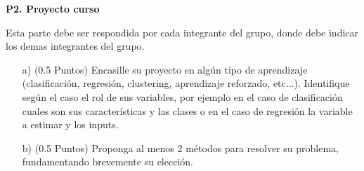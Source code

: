 \documentclass[11pt,letterpaper]{article}
\begin{document}
\newpage

\vspace{5 mm}
\noindent\textbf{P2. Proyecto curso}
\vspace{5 mm}

Esta parte debe ser respondida por cada integrante del grupo, donde debe indicar los demas integrantes del grupo.

\begin{enumerate}
    \item[a)](0.5 Puntos) Encasille su proyecto en algún tipo de aprendizaje (clasificación, regresión, clustering, aprendizaje reforzado, etc...).  Identifique según el caso el rol de sus variables, por ejemplo en el caso de clasificación cuales son sus características y las clases o en el caso de regresión la variable a estimar y los inputs.
    \item[b)](0.5 Puntos) Proponga al menos 2 métodos para resolver su problema, fundamentando brevemente su elección.
\end{enumerate}
\end{document}
